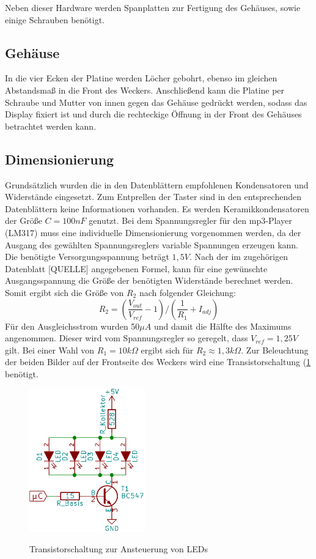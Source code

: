 \documentclass[journal, a4paper]{IEEEtran}
\begin{document}
		Neben dieser Hardware werden Spanplatten zur Fertigung des Gehäuses, sowie einige Schrauben benötigt.

	\subsection{Gehäuse}
	\label{sc:Hardware:subsc:Gehäuse}
	In die vier Ecken der Platine werden Löcher gebohrt, ebenso im gleichen Abstandsmaß in die Front des Weckers. Anschließend kann die Platine per Schraube und Mutter von innen gegen das Gehäuse gedrückt werden, sodass das Display fixiert ist und durch die rechteckige Öffnung in der Front des Gehäuses betrachtet werden kann.
		
		\subsection{Dimensionierung}
			\label{sc:Hardware:subsc:Dimensionierung}
			Grundsätzlich wurden die in den Datenblättern empfohlenen Kondensatoren und Widerstände eingesetzt. Zum Entprellen der Taster sind in den entsprechenden Datenblättern keine Informationen vorhanden. Es werden Keramikkondensatoren der Größe $C=100 nF$ genutzt. Bei dem Spannungsregler für den mp3-Player (LM317) muss eine individuelle Dimensionierung vorgenommen werden, da der Ausgang des gewählten Spannungsreglers variable Spannungen erzeugen kann.
			Die benötigte Versorgungsspannung beträgt $1,5 V$. Nach der im zugehörigen Datenblatt [QUELLE] angegebenen Formel, kann für eine gewünschte Ausgangsspannung die Größe der benötigten Widerstände berechnet werden.  Somit ergibt sich die Größe von $R_2$ nach folgender Gleichung:
			\begin{equation}
				\label{eqn:1,5VDC}
				R_2 = (\frac{V_{out}}{V_{ref}}-1) / (\frac{1}{R_1}+I_{adj})
			\end{equation}	
			Für den Ausgleichsstrom wurden 50$\mu A$ und damit die Hälfte des Maximums angenommen. Dieser wird vom Spannungsregler so geregelt, dass $V_{ref} = 1,25 V$ gilt. Bei einer Wahl von $R_1 = 10k\Omega$ ergibt sich für $R_2 \approx 1,3 k\Omega$.
			Zur Beleuchtung der beiden Bilder auf der Frontseite des Weckers wird eine Transistorschaltung (\ref{fig:Transistor} benötigt. 
			\begin{figure}
				\begin{center}
					\label{fig:Transistor}
					\includegraphics[width=5cm]{./Grafiken/Transistor.png}
					\caption{Transistorschaltung zur Ansteuerung von LEDs}
				\end{center}
			\end{figure}
\end{document}
